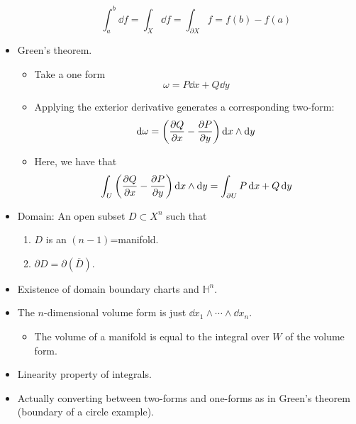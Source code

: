 \documentclass[../notes.tex]{subfiles}
\begin{document}
\begin{itemize}
\begin{itemize}
\begin{equation*}
            \int_a^b\dd f = \int_X\dd f
            = \int_{\partial X}f
            = f(b)-f(a)
        \end{equation*}
    \end{itemize}
    \item Green's theorem.
    \begin{itemize}
        \item Take a one form
        \begin{equation*}
            \omega = P\dd{x}+Q\dd{y}
        \end{equation*}
        \item Applying the exterior derivative generates a corresponding two-form:
        \begin{equation*}
            \dd\omega = \left( \pdv{Q}{x}-\pdv{P}{y} \right)\dd{x}\wedge\dd{y}
        \end{equation*}
        \item Here, we have that
        \begin{equation*}
            \int_U\left( \pdv{Q}{x}-\pdv{P}{y} \right)\dd{x}\wedge\dd{y} = \int_{\partial U}P\dd{x}+Q\dd{y}
        \end{equation*}
    \end{itemize}
    \item Domain: An open subset $D\subset X^n$ such that
    \begin{enumerate}
        \item $D$ is an $(n-1)$=manifold.
        \item $\partial D=\partial(\overline{D})$.
    \end{enumerate}
    \item Existence of domain boundary charts and $\mathbb{H}^n$.
    \item The $n$-dimensional volume form is just $\dd{x_1}\wedge\cdots\wedge\dd{x_n}$.
    \begin{itemize}
        \item The volume of a manifold is equal to the integral over $W$ of the volume form.
    \end{itemize}
    \item Linearity property of integrals.
    \item Actually converting between two-forms and one-forms as in Green's theorem (boundary of a circle example).
\end{itemize}
\end{document}

